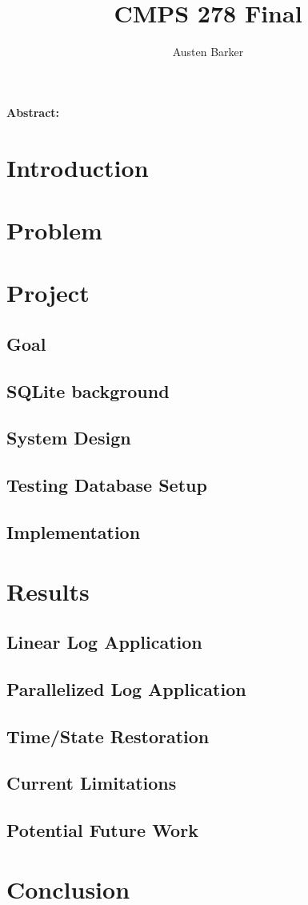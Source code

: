 \documentclass{article}
\begin{document}
\title{CMPS 278 Final}
\author{Austen Barker}
\maketitle

\begin{multicols}{2}

\textbf{Abstract:} 
\section{Introduction}
\section{Problem}
\section{Project}
\subsection{Goal}
\subsection{SQLite background}
\subsection{System Design}
\subsection{Testing Database Setup}
\subsection{Implementation}
\section{Results}
\subsection{Linear Log Application}
\subsection{Parallelized Log Application}
\subsection{Time/State Restoration}
\subsection{Current Limitations}
\subsection{Potential Future Work}
\section{Conclusion}



\end{multicols}
\end{document}
